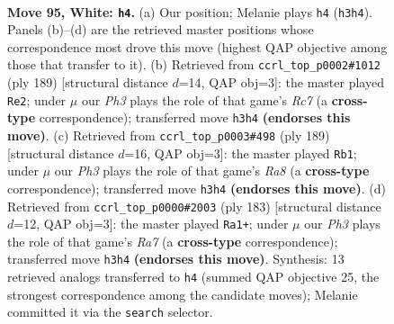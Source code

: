\documentclass[11pt]{article}
\begin{document}
\clearpage

\begin{figure}[p]\centering
\begin{subfigure}{0.46\textwidth}\centering
\resizebox{\linewidth}{!}{%
\newchessgame
\chessboard[
  setfen={6k1/B7/4r3/1R6/4p3/5p1P/3K1P2/8 w - - 15 95},
  showmover=false,
  pgfstyle=straightmove, color=movearrow, markmove={h3-h4}
]}
\caption{}
\end{subfigure}\hfill
\begin{subfigure}{0.46\textwidth}\centering
\resizebox{\linewidth}{!}{%
\newchessgame
\chessboard[
  setfen={8/6k1/3K4/6Pp/5R1P/8/2r5/8 b - - 16 95},
  showmover=false,
  pgfstyle=straightmove, color=movearrow, markmove={c2-e2}
]}
\caption{}
\end{subfigure}
\\[4pt]
\begin{subfigure}{0.46\textwidth}\centering
\resizebox{\linewidth}{!}{%
\newchessgame
\chessboard[
  setfen={8/8/6k1/6p1/6P1/5R1P/7K/r7 b - - 29 95},
  showmover=false,
  pgfstyle=straightmove, color=movearrow, markmove={a1-b1}
]}
\caption{}
\end{subfigure}\hfill
\begin{subfigure}{0.46\textwidth}\centering
\resizebox{\linewidth}{!}{%
\newchessgame
\chessboard[
  setfen={8/8/5k2/5p2/5P2/2R1P3/r7/3K4 b - - 62 92},
  showmover=false,
  pgfstyle=straightmove, color=movearrow, markmove={a2-a1}
]}
\caption{}
\end{subfigure}
\caption{\textbf{Move 95, White: \texttt{h4}.} (a) Our position; Melanie plays \texttt{h4} (\texttt{h3h4}). Panels (b)--(d) are the retrieved master positions whose correspondence most drove this move (highest QAP objective among those that transfer to it). (b) Retrieved from \texttt{ccrl\_top\_p0002\#1012} (ply 189) [structural distance $d$=14, QAP obj=3]: the master played \texttt{Re2}; under $\mu$ our \emph{Ph3} plays the role of that game's \emph{Rc7} (a \textbf{cross-type} correspondence); transferred move \texttt{h3h4} \textbf{(endorses this move)}. (c) Retrieved from \texttt{ccrl\_top\_p0003\#498} (ply 189) [structural distance $d$=16, QAP obj=3]: the master played \texttt{Rb1}; under $\mu$ our \emph{Ph3} plays the role of that game's \emph{Ra8} (a \textbf{cross-type} correspondence); transferred move \texttt{h3h4} \textbf{(endorses this move)}. (d) Retrieved from \texttt{ccrl\_top\_p0000\#2003} (ply 183) [structural distance $d$=12, QAP obj=3]: the master played \texttt{Ra1+}; under $\mu$ our \emph{Ph3} plays the role of that game's \emph{Ra7} (a \textbf{cross-type} correspondence); transferred move \texttt{h3h4} \textbf{(endorses this move)}. Synthesis: 13 retrieved analogs transferred to \texttt{h4} (summed QAP objective 25, the strongest correspondence among the candidate moves); Melanie committed it via the \texttt{search} selector.}
\label{fig:thought-m188}
\end{figure}
\end{document}
